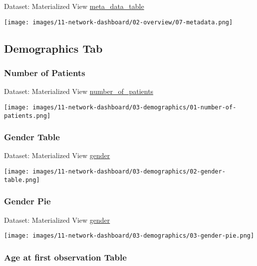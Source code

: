 \documentclass[
]{book}
\begin{document}
Dataset: Materialized View \href{materialized-views-1.html\#meta_data_table}{meta\_data\_table}

\texttt{[image: images/11-network-dashboard/02-overview/07-metadata.png]}

\hypertarget{demographics-tab}{%
\subsection*{Demographics Tab}\label{demographics-tab}}

\hypertarget{number-of-patients}{%
\subsubsection*{Number of Patients}\label{number-of-patients}}

Dataset: Materialized View \href{materialized-views-1.html\#number_of_patients}{number\_of\_patients}

\texttt{[image: images/11-network-dashboard/03-demographics/01-number-of-patients.png]}

\hypertarget{gender-table}{%
\subsubsection*{Gender Table}\label{gender-table}}

Dataset: Materialized View \href{materialized-views-1.html\#gender}{gender}

\texttt{[image: images/11-network-dashboard/03-demographics/02-gender-table.png]}

\hypertarget{gender-pie}{%
\subsubsection*{Gender Pie}\label{gender-pie}}

Dataset: Materialized View \href{materialized-views-1.html\#gender}{gender}

\texttt{[image: images/11-network-dashboard/03-demographics/03-gender-pie.png]}

\hypertarget{age-at-first-observation-table}{%
\subsubsection*{Age at first observation Table}\label{age-at-first-observation-table}}
\end{document}

